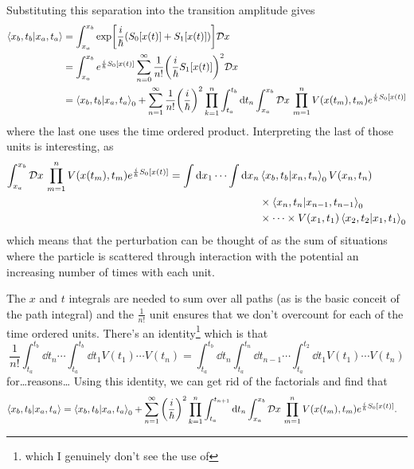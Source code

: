 \documentclass[]{revision-notes}
\begin{document}
Substituting this separation into the transition amplitude gives
\begin{align*}
  \braket{x_b, t_b}{x_a, t_a} &= \int_{x_a}^{x_b} \exp[\frac{i}{\hbar}(S_0[x(t)] + S_1[x(t)])] \mathcal{D} x\,\\
  &=  \int_{x_a}^{x_b} e^{\frac{i}{\hbar}S_0[x(t)]}\sum_{n=0}^\infty \frac{1}{n!}\qty(\frac{i}{\hbar}S_1[x(t)])^2 \mathcal{D} x\,\\
  &= \braket{x_b, t_b}{x_a, t_a}_0 + \sum_{n=1}^\infty  \frac{1}{n!}\qty(\frac{i}{\hbar})^2 \prod_{k=1}^{n} \int_{t_a}^{t_b} \dd{t_n} \int_{x_a}^{x_b} \mathcal{D} x\, \prod_{m=1}^{n}V(x(t_m), t_m) e^{\frac{i}{\hbar} S_0[x(t)] }
\end{align*}
where the last one uses the time ordered product.
Interpreting the last of those units is interesting, as
\begin{align*}
  \int_{x_a}^{x_b} \mathcal{D} x\, \prod_{m=1}^{n}V(x(t_m), t_m) e^{\frac{i}{\hbar} S_0[x(t)] } = \int \dd{x_1} \cdots \int \dd{x_n} &\braket{x_b, t_b}{x_{n}, t_{n}}_0 V(x_n, t_n)  \\
  &\times \braket{x_{n}, t_{n}}{x_{n-1}, t_{n-1}}_0 \\
  & \times \cdots \times V(x_1, t_1) \braket{x_{2}, t_{2}}{x_{1}, t_{1}}_0
\end{align*}
which means that the perturbation can be thought of as the sum of situations where the particle is scattered through interaction with the potential an increasing number of times with each unit.

The \(x\) and \(t\) integrals are needed to sum over all paths (as is the basic conceit of the path integral) and the \( \frac{1}{n!}\) unit ensures that we don't overcount for each of the time ordered units.
There's an identity\footnote{which I genuinely don't see the use of} which is that
\begin{equation*}
  \frac{1}{n!}\int_{t_a}^{t_b} \dd{t_n} \cdots \int_{t_a}^{t_b} \dd{t_1} V(t_1) \cdots V(t_n) = \int_{t_a}^{t_b} \dd{t_n} \int_{t_a}^{t_n} \dd{t_{n-1}} \cdots \int_{t_a}^{t_2} \dd{t_1} V(t_1) \cdots V(t_n)
\end{equation*}
for\ldots reasons\ldots
Using this identity, we can get rid of the factorials and find that
\begin{align*}
    \braket{x_b, t_b}{x_a, t_a} &= \braket{x_b, t_b}{x_a, t_a}_0 + \sum_{n=1}^\infty \qty(\frac{i}{\hbar})^2 \prod_{k=1}^{n} \int_{t_a}^{t_{n+1}} \dd{t_n} \int_{x_a}^{x_b} \mathcal{D} x\, \prod_{m=1}^{n}V(x(t_m), t_m) e^{\frac{i}{\hbar} S_0[x(t)] }.
\end{align*}
\end{document}
